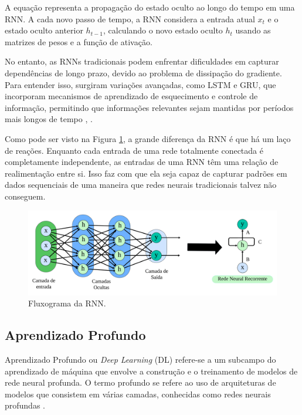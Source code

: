  A equação representa a propagação do estado oculto ao longo do tempo em uma RNN. A cada novo passo de tempo, a RNN considera a entrada atual $ x_t $ e o estado oculto anterior $ h_{t-1} $, calculando o novo estado oculto $ h_t $ usando as matrizes de pesos e a função de ativação. 
 
  No entanto, as RNNs tradicionais podem enfrentar dificuldades em capturar dependências de longo prazo, devido ao problema de dissipação do gradiente. Para entender isso, surgiram variações avançadas, como LSTM  e GRU, que incorporam mecanismos de aprendizado de esquecimento e controle de informação, permitindo que informações relevantes sejam mantidas por períodos mais longos de tempo \cite{WANG2023116247}, \cite{ZHAO2023114136}.
 
 Como pode ser visto na Figura \ref{fig:rnn1}, a grande diferença da RNN é que há um laço de reações. Enquanto cada entrada de uma rede totalmente conectada é completamente independente, as entradas de uma RNN têm uma relação de realimentação entre si. Isso faz com que ela seja capaz de capturar padrões em dados sequenciais de uma maneira que redes neurais tradicionais talvez não conseguem.
  
 \begin{figure}[!htb]
 	\centering
 	\caption{Fluxograma da RNN.}
 	\label{fig:rnn1}
 	\includegraphics[width=\linewidth]{Modelos/Figuras/rnn1.pdf}
 
 \end{figure}
 
  \subsection{Aprendizado Profundo}

 Aprendizado Profundo ou \textit{Deep Learning} (DL) refere-se a um subcampo do aprendizado de máquina que envolve a construção e o treinamento de modelos de rede neural profunda. O termo profundo se refere ao uso de arquiteturas de modelos que consistem em várias camadas, conhecidas como redes neurais profundas \cite{KOTHONA2023101149}.
 

